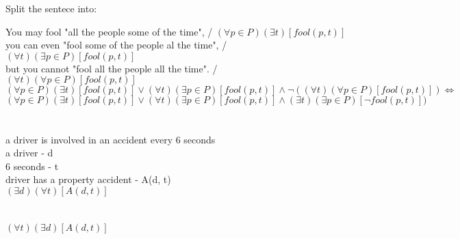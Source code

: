 \documentclass{article}
\begin{document}
Split the sentece into:

You may fool "all the people some of the time", / $(\forall p \in P)(\exists t)[fool(p,t)]$ \\
you can even "fool some of the people al the time", / $(\forall t)(\exists p \in P)[fool(p, t)]$\\
but you cannot "fool all the people all the time". / $(\forall t)(\forall p \in P)[fool(p,t)]$ \\

$(\forall p \in P)(\exists t)[fool(p,t)] \vee (\forall t)(\exists p \in P)[fool(p, t)] \wedge \neg((\forall t)(\forall p \in P)[fool(p,t)]) \Leftrightarrow$ \\
$(\forall p \in P)(\exists t)[fool(p,t)] \vee (\forall t)(\exists p \in P)[fool(p, t)] \wedge (\exists t)(\exists p \in P)[\neg fool(p,t)])$

\section{}
a driver is involved in an accident every 6 seconds \\
a driver - d \\
6 seconds - t \\
driver has a property accident - A(d, t) \\
$(\exists d)(\forall t)[A(d, t)]$ \\

\section{}
$(\forall t)(\exists d)[A(d, t)]$ \\
\end{document}
